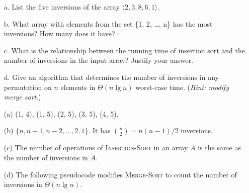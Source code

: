 \documentclass{report}
\makeatletter
\renewenvironment{framed}{%
 \def\FrameCommand##1{\hskip\@totalleftmargin
 \fboxsep=\FrameSep\fbox{##1}}%
 \MakeFramed {\advance\hsize-\width
   \@totalleftmargin\z@ \linewidth\hsize
   \@setminipage}}%
 {\par\unskip\endMakeFramed}
\DeclarePairedDelimiter{\floor}{\lfloor}{\rfloor}
\makeatother
\begin{document}
\begin{enumerate}
{\begin{enumerate}
\item[a.] List the five inversions of the array
$\langle 2, 3, 8, 6, 1 \rangle$.

\item[b.] What array with elements from the set \{1, 2, \dots, n\}
has the most inversions? How many does it have?

\item[c.] What is the relationship between the running time of insertion sort
and the number of inversions in the input array? Justify your answer.

\item[d.] Give an algorithm that determines the number of inversions in any
permutation on $n$ elements in $\Theta(n \lg n)$ worst-case time.
(\emph{Hint: modify merge sort}.)
\end{enumerate}
}

\begin{framed}
\begin{enumerate}
  \item[(a)] (1, 4), (1, 5), (2, 5), (3, 5), (4, 5).
  \item[(b)] $\{n, n - 1, n - 2, \dots, 2, 1\}$.
    It has $\binom{n}{2} = n (n - 1) / 2$ inversions.
  \item[(c)] The number of operations of \textsc{Insertion-Sort} in an array
    $A$ is the same as the number of inversions in $A$.
  \item[(d)] The following pseudocode modifies \textsc{Merge-Sort} to count the
    number of inversions in $\Theta(n \lg n)$.\\
    \begin{algorithm}[H]
    \SetAlgoNoEnd\DontPrintSemicolon%
    \BlankLine
    \end{algorithm}

    \begin{algorithm}[H]
    \SetAlgoNoEnd\DontPrintSemicolon
    \BlankLine
    \end{algorithm}
\end{enumerate}
\end{framed}

\end{enumerate}
\end{document}
